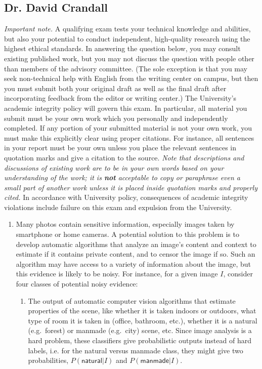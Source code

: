 \documentclass[11pt]{article}
\begin{document}
\begin{appendices}
\subsection{Dr. David Crandall}\label{app:crandall}

\textit{Important note.}  A qualifying exam tests your technical
knowledge and abilities, but also your potential to conduct
independent, high-quality research using  the highest ethical standards.
In answering the question below, you may consult existing
published work, but you may not discuss the question with people other than
members of the advisory committee.  (The sole exception is that you
may seek non-technical help with English from the writing center on
campus, but then you must submit both your original draft as well as
the final draft after incorporating feedback from the editor or
writing center.)  The University's academic integrity policy will
govern this exam. In particular, all material you submit
must be your own work which you
personally and independently completed. If any portion of your
submitted material is not your own work, you must make this explicitly
clear using proper citations. For instance, all sentences in your
report must be your own unless you place the relevant sentences in
quotation marks and give a citation to the source.  \textit{Note that
  descriptions and discussions of existing work are to be in your own
  words based on your understanding of the work; it is \textbf{not}
  acceptable to copy or paraphrase even a small part of another work
  unless it is placed inside quotation marks and properly cited.}
{In accordance with University policy, consequences of academic
  integrity violations  include failure on this exam and expulsion
  from the University.}


\vspace{-12pt}
\begin{enumerate}
\item
Many photos contain sensitive information, especially images
  taken by smartphone or home cameras. A potential solution to
  this problem is to develop automatic algorithms that analyze an
  image's content and context to estimate if it contains private
  content, and to censor the image if so.  Such an  algorithm
  may have access to a variety of information about the image, but
  this evidence is likely to be noisy. For instance, for a given
  image $I$, consider four classes of potential noisy evidence:

\begin{enumerate}
\item The output of automatic computer vision algorithms that estimate
  properties of the scene, like whether it is taken indoors or
  outdoors, what type of room it is taken in (office, bathroom, etc.),
  whether it is a natural (e.g.\ forest) or manmade (e.g.\ city) scene,
  etc. Since image analysis is a hard problem,  these classifiers
  give probabilistic outputs instead of hard labels,
  i.e. for the natural versus manmade class, they might give two
probabilities, $P(\textsf{natural}|I)$ and $P(\textsf{manmade}|I)$.


\end{enumerate}
\end{enumerate}
\end{appendices}
\end{document}

